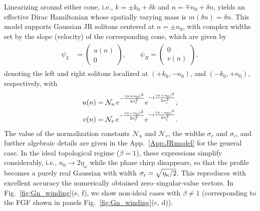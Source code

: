 \documentclass[a4paper,twocolumn,floatfix,10pt,superscriptaddress]%
{quantumarticle}
\newcommand{\mcl}[1]{\mathcal{#1}}
\begin{document}
 Linearizing around either cone, i.e., $k=\pm k_0+\delta k$ and $n=\mp n_0+\delta n$, yields an effective Dirac Hamiltonian whose spatially varying mass is $m(\delta n)=\delta n$. This model supports Gaussian JR solitons centered at $n=\pm n_0$, with complex widths set by the slope (velocity) of the corresponding cone, which are given by
\begin{align}\label{psiLR}
\begin{aligned}
\psi_L &=
\begin{pmatrix} u(n) \\ 0 \end{pmatrix},
\qquad
\psi_R =
\begin{pmatrix} 0 \\ v(n) \end{pmatrix},
\end{aligned}
\end{align} denoting the left and right solitons localized at $(+k_0,-n_0)$, and $(-k_0,+n_0)$, respectively, 
with
\begin{align}
\begin{aligned}
u(n) &= \mcl{N}_u \,e^{-\frac{(n+n_0)^2}{2\sigma_{\rm r}^2}}
        e^{-i\frac{(n + n_0)^2}{2\sigma_{\rm i}^2}}, \\
v(n) &= \mcl{N}_v \,e^{-\frac{(n-n_0)^2}{2\sigma_{\rm r}^2}}
        e^{-i\frac{(n-n_0)^2}{2\sigma_{\rm i}^2}}.
\end{aligned}
\end{align}
The value of the normalization constants $\mcl{N}_u$ and $\mcl{N}_v$, the widths $\sigma_r$ and $\sigma_i$, and further algebraic details are given in the App.~\ref{App:JRmodel} for the general case. In the ideal topological regime ($\beta=1$), these expressions simplify considerably, i.e., $n_0\to 2\eta_\omega$ while the phase chirp disappears, so that the profile becomes a purely real Gaussian with width $\sigma_{\rm r}=\sqrt{\eta_\kappa/2}$. This reproduces with excellent accuracy the numerically obtained zero–singular-value vectors. In Fig.~\ref{fig:Gn_winding}(e, f), we show non-ideal cases with $\beta\neq 1$ (corresponding to the FGF shown in panels Fig.~\ref{fig:Gn_winding}(c, d)).
\end{document}
